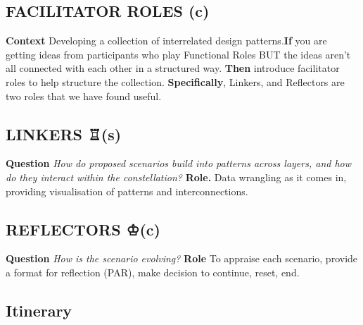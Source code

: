 \documentclass[acmlarge,timestamp]{acmart}
\newcommand{\sensory}{(s)}
\newcommand{\cognitive}{(c)}
\begin{document}
\subsection*{FACILITATOR ROLES {\hfill \cognitive}}
\textbf{Context} Developing a collection of interrelated design
patterns.\newline \textbf{If} you are getting ideas from participants
who play {\sc Functional Roles} BUT the ideas aren’t all connected
with each other in a structured way.\newline
\textbf{Then} introduce
facilitator roles to help structure the collection.\newline
\textbf{Specifically}, {\sc Linkers}, and {\sc Reflectors} are two
roles that we have found useful.

\subsection*{LINKERS {\chess ♖}{\hfill \sensory}}

\textbf{Question}
\emph{How do proposed scenarios build into patterns across layers, and how do they interact within the constellation?}\newline
\textbf{Role.} Data wrangling as it comes in, providing visualisation of patterns and interconnections.

\subsection*{REFLECTORS {\chess ♔}{\hfill \cognitive}}

\textbf{Question} \emph{How is the scenario evolving?}\newline
\textbf{Role} To appraise each scenario, provide a format for reflection (PAR), make decision to continue, reset, end.

\subsection{Itinerary}
\end{document}
